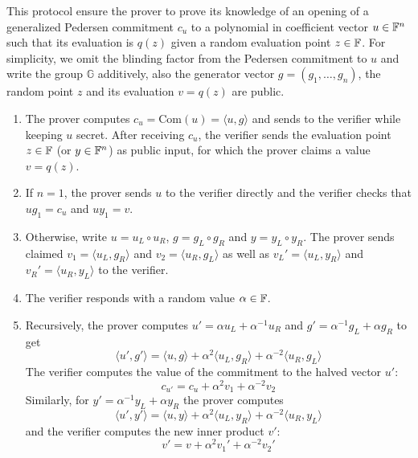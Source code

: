 \documentclass{article}
\begin{document}
\begin{boxx1}
This protocol ensure the prover to prove its knowledge of an opening of a generalized Pedersen commitment $c_u$ to a polynomial in coefficient vector $u \in \mathbb{F}^n$ such that its evaluation is $q(z)$ given a random evaluation point $z \in \mathbb{F}$. For simplicity, we omit the blinding factor from the Pedersen commitment to $u$ and write the group $\mathbb{G}$ additively, also the generator vector $g = (g_1, \dots, g_n)$, the random point $z$ and its evaluation $v = q(z)$ are public.
\begin{enumerate}
\item\label{item:89} The prover computes $c_u = \text{Com}(u) = \langle u, g \rangle$ and sends to the verifier while keeping $u$ secret. After receiving $c_u$, the verifier sends the evaluation point $z \in \mathbb{F}$ (or $y \in \mathbb{F}^n$) as public input, for which the prover claims a value $v = q(z)$. 
\item\label{item:90} If $n = 1$, the prover sends $u$ to the verifier directly and the verifier checks that $ug_1 = c_u$ and $uy_1 = v$. 
\item\label{item:91} Otherwise, write $u = u_L \circ u_R$, $g = g_L \circ g_R$ and $ y = y_L \circ y_R$. The prover sends claimed $v_1 = \langle u_{L}, g_R \rangle$ and $v_{2} = \langle u_{R}, g_L \rangle$ as well as $v_L' = \langle u_L, y_R\rangle$ and $v_R' = \langle u_R, y_L\rangle$ to the verifier. 
\item\label{item:92} The verifier responds with a random value $\alpha \in \mathbb{F}$. 
\item\label{item:93} Recursively, the prover computes $u' = \alpha u_L + \alpha^{-1} u_R$ and $g'  = \alpha^{-1} g_L + \alpha g_R$ to get
\begin{equation*}
\langle u', g' \rangle = \langle u, g \rangle + \alpha^2 \langle u_{L}, g_R \rangle + \alpha^{-2} \langle u_R, g_{L} \rangle
\end{equation*}
The verifier computes the value of the commitment to the halved vector $u'$:
\begin{equation*}
c_{u'} = c_u + \alpha^2 v_1 + \alpha^{-2} v_2
\end{equation*}
Similarly, for $y'  = \alpha^{-1} y_L + \alpha y_R$ the prover computes 
\begin{equation*}
\langle u', y' \rangle = \langle u, y \rangle + \alpha^2 \langle u_{L}, y_R \rangle + \alpha^{-2} \langle u_R, y_{L} \rangle
\end{equation*}
and the verifier computes the new inner product $v'$:
\begin{equation*}
v' = v + \alpha^2 v_1' + \alpha^{-2} v_2'
\end{equation*}
\end{enumerate}
\end{boxx1}
\end{document}
